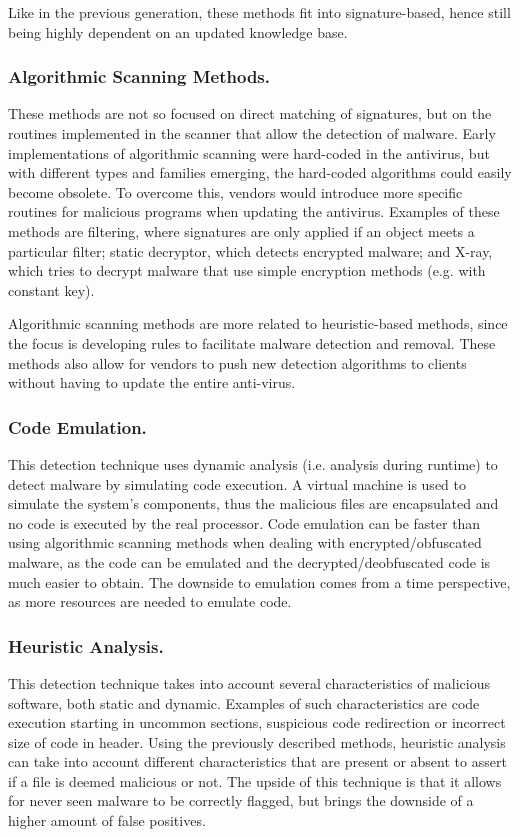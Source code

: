 \documentclass{llncs}
\begin{document}
Like in the previous generation, these methods fit into signature-based, hence still being highly dependent on an updated knowledge base.

\subsubsection{Algorithmic Scanning Methods.} These methods are not so focused on direct matching of signatures, but on the routines implemented in the scanner that allow the detection of malware. Early implementations of algorithmic scanning were hard-coded in the antivirus, but with different types and families emerging, the hard-coded algorithms could easily become obsolete. To overcome this, vendors would introduce more specific routines for malicious programs when updating the antivirus. Examples of these methods are filtering, where signatures are only applied if an object meets a particular filter; static decryptor, which detects encrypted malware; and X-ray, which tries to decrypt malware that use simple encryption methods (e.g.  with constant key).

Algorithmic scanning methods are more related to heuristic-based methods, since the focus is developing rules to facilitate malware detection and removal. These methods also allow for vendors to push new detection algorithms to clients without having to update the entire anti-virus.

\subsubsection{Code Emulation.} This detection technique uses dynamic analysis (i.e. analysis during runtime) to detect malware by simulating code execution. A virtual machine is used to simulate the system's components, thus the malicious files are encapsulated and no code is executed by the real processor. Code emulation can be faster than using algorithmic scanning methods when dealing with encrypted/obfuscated malware, as the code can be emulated and the decrypted/deobfuscated code is much easier to obtain. The downside to emulation comes from a time perspective, as more resources are needed to emulate code.

\subsubsection{Heuristic Analysis.} This detection technique takes into account several characteristics of malicious software, both static and dynamic. Examples of such characteristics are code execution starting in uncommon sections, suspicious code redirection or incorrect size of code in header. Using the previously described methods, heuristic analysis can take into account different characteristics that are present or absent to assert if a file is deemed malicious or not. The upside of this technique is that it allows for never seen malware to be correctly flagged, but brings the downside of a higher amount of false positives.
\end{document}

